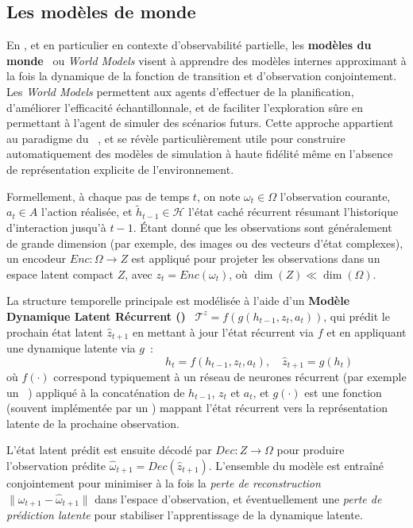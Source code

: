 \subsection{Les modèles de monde}

En , et en particulier en contexte d'observabilité partielle, les \textbf{modèles du monde}~\cite{ha2018recurrent, hafner2020dream} ou \textit{World Models} visent à apprendre des modèles internes approximant à la fois la dynamique de la fonction de transition et d'observation conjointement. Les \textit{World Models} permettent aux agents d'effectuer de la planification, d'améliorer l'efficacité échantillonnale, et de faciliter l'exploration sûre en permettant à l'agent de simuler des scénarios futurs. Cette approche appartient au paradigme du ~\cite{moerland2020model}, et se révèle particulièrement utile pour construire automatiquement des modèles de simulation à haute fidélité même en l'absence de représentation explicite de l'environnement.

Formellement, à chaque pas de temps $t$, on note $\omega_t \in \Omega$ l'observation courante, $a_t \in A$ l'action réalisée, et $\tilde{h}_{t-1} \in \mathcal{H}$ l'état caché récurrent résumant l'historique d'interaction jusqu'à $t-1$. Étant donné que les observations sont généralement de grande dimension (par exemple, des images ou des vecteurs d'état complexes), un encodeur $Enc: \Omega \rightarrow Z$ est appliqué pour projeter les observations dans un espace latent compact $Z$, avec $z_t = Enc(\omega_t)$, où $\dim(Z) \ll \dim(\Omega)$.

La structure temporelle principale est modélisée à l'aide d'un \textbf{Modèle Dynamique Latent Récurrent ()}~\cite{hafner2020dream} $\mathcal{T}^{z} = f(g(h_{t-1}, z_t, a_t))$, qui prédit le prochain état latent $\hat{z}_{t+1}$ en mettant à jour l'état récurrent via $f$ et en appliquant une dynamique latente via $g$~:
\[
  \hspace{4cm}h_t = f(h_{t-1}, z_t, a_t), \quad \hat{z}_{t+1} = g(h_t)
\]
où $f(\cdot)$ correspond typiquement à un réseau de neurones récurrent  (par exemple un ~\cite{hochreiter1997long}) appliqué à la concaténation de $h_{t-1}$, $z_t$ et $a_t$, et $g(\cdot)$ est une fonction (souvent implémentée par un ) mappant l'état récurrent vers la représentation latente de la prochaine observation.

L'état latent prédit est ensuite décodé par $Dec: Z \rightarrow \Omega$ pour produire l'observation prédite $\hat{\omega}_{t+1} = Dec(\hat{z}_{t+1})$. L'ensemble du modèle est entraîné conjointement pour minimiser à la fois la \emph{perte de reconstruction} $\|\omega_{t+1} - \hat{\omega}_{t+1}\|$ dans l'espace d'observation, et éventuellement une \emph{perte de prédiction latente} pour stabiliser l'apprentissage de la dynamique latente.

